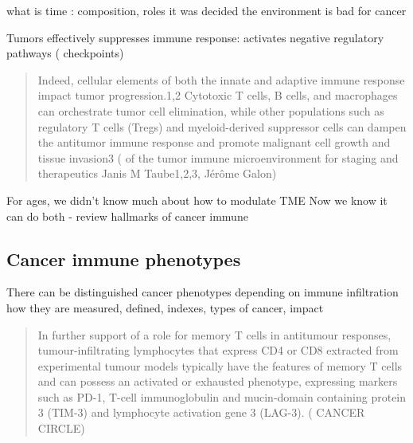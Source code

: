 \documentclass[12pt,]{book}
\theoremstyle{definition}
\theoremstyle{definition}
\theoremstyle{definition}
\theoremstyle{remark}
\begin{document}
what is time : composition, roles it was decided the environment is bad
for cancer

Tumors effectively suppresses immune response: activates negative
regulatory pathways ( checkpoints)

\begin{quote}
Indeed, cellular elements of both the innate and adaptive immune
response impact tumor progression.1,2 Cytotoxic T cells, B cells, and
macrophages can orchestrate tumor cell elimination, while other
populations such as regulatory T cells (Tregs) and myeloid-derived
suppressor cells can dampen the antitumor immune response and promote
malignant cell growth and tissue invasion3 (\citet{Implications} of the
tumor immune microenvironment for staging and therapeutics Janis M
Taube1,2,3, Jérôme Galon)
\end{quote}

For ages, we didn't know much about how to modulate TME Now we know it
can do both - review hallmarks of cancer immune

\hypertarget{cancer-immune-phenotypes}{%
\subsection{Cancer immune phenotypes}\label{cancer-immune-phenotypes}}

There can be distinguished cancer phenotypes depending on immune
infiltration how they are measured, defined, indexes, types of cancer,
impact

\begin{quote}
In further support of a role for memory T cells in antitumour responses,
tumour-infiltrating lymphocytes that express CD4 or CD8 extracted from
experimental tumour models typically have the features of memory T cells
and can possess an activated or exhausted phenotype, expressing markers
such as PD-1, T-cell immunoglobulin and mucin-domain containing protein
3 (TIM-3) and lymphocyte activation gene 3 (LAG-3). (\citet{IMMUNE}
CANCER CIRCLE)
\end{quote}
\end{document}

